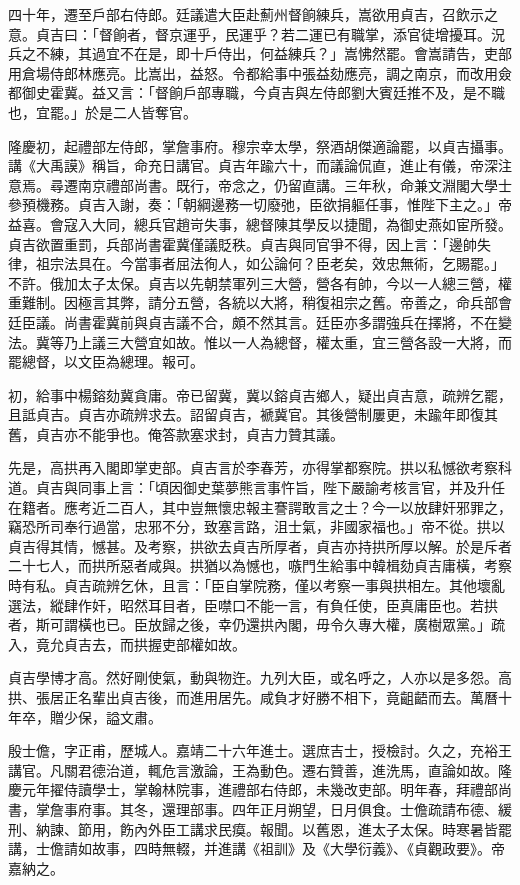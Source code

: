 \begin{pinyinscope}
四十年，遷至戶部右侍郎。廷議遣大臣赴薊州督餉練兵，嵩欲用貞吉，召飲示之意。貞吉曰：「督餉者，督京運乎，民運乎？若二運已有職掌，添官徒增擾耳。況兵之不練，其過宜不在是，即十戶侍出，何益練兵？」嵩怫然罷。會嵩請告，吏部用倉場侍郎林應亮。比嵩出，益怒。令都給事中張益劾應亮，調之南京，而改用僉都御史霍冀。益又言：「督餉戶部專職，今貞吉與左侍郎劉大賓廷推不及，是不職也，宜罷。」於是二人皆奪官。

隆慶初，起禮部左侍郎，掌詹事府。穆宗幸太學，祭酒胡傑適論罷，以貞吉攝事。講《大禹謨》稱旨，命充日講官。貞吉年踰六十，而議論侃直，進止有儀，帝深注意焉。尋遷南京禮部尚書。既行，帝念之，仍留直講。三年秋，命兼文淵閣大學士參預機務。貞吉入謝，奏：「朝綱邊務一切廢弛，臣欲捐軀任事，惟陛下主之。」帝益喜。會寇入大同，總兵官趙岢失事，總督陳其學反以捷聞，為御史燕如宦所發。貞吉欲置重罰，兵部尚書霍冀僅議貶秩。貞吉與同官爭不得，因上言：「邊帥失律，祖宗法具在。今當事者屈法徇人，如公論何？臣老矣，效忠無術，乞賜罷。」不許。俄加太子太保。貞吉以先朝禁軍列三大營，營各有帥，今以一人總三營，權重難制。因極言其弊，請分五營，各統以大將，稍復祖宗之舊。帝善之，命兵部會廷臣議。尚書霍冀前與貞吉議不合，頗不然其言。廷臣亦多謂強兵在擇將，不在變法。冀等乃上議三大營宜如故。惟以一人為總督，權太重，宜三營各設一大將，而罷總督，以文臣為總理。報可。

初，給事中楊鎔劾冀貪庸。帝已留冀，冀以鎔貞吉鄉人，疑出貞吉意，疏辨乞罷，且詆貞吉。貞吉亦疏辨求去。詔留貞吉，褫冀官。其後營制屢更，未踰年即復其舊，貞吉亦不能爭也。俺答款塞求封，貞吉力贊其議。

先是，高拱再入閣即掌吏部。貞吉言於李春芳，亦得掌都察院。拱以私憾欲考察科道。貞吉與同事上言：「頃因御史葉夢熊言事忤旨，陛下嚴諭考核言官，并及升任在籍者。應考近二百人，其中豈無懷忠報主謇諤敢言之士？今一以放肆奸邪罪之，竊恐所司奉行過當，忠邪不分，致塞言路，沮士氣，非國家福也。」帝不從。拱以貞吉得其情，憾甚。及考察，拱欲去貞吉所厚者，貞吉亦持拱所厚以解。於是斥者二十七人，而拱所惡者咸與。拱猶以為憾也，嗾門生給事中韓楫劾貞吉庸橫，考察時有私。貞吉疏辨乞休，且言：「臣自掌院務，僅以考察一事與拱相左。其他壞亂選法，縱肆作奸，昭然耳目者，臣噤口不能一言，有負任使，臣真庸臣也。若拱者，斯可謂橫也已。臣放歸之後，幸仍還拱內閣，毋令久專大權，廣樹眾黨。」疏入，竟允貞吉去，而拱握吏部權如故。

貞吉學博才高。然好剛使氣，動與物迕。九列大臣，或名呼之，人亦以是多怨。高拱、張居正名輩出貞吉後，而進用居先。咸負才好勝不相下，竟齟齬而去。萬曆十年卒，贈少保，謚文肅。

殷士儋，字正甫，歷城人。嘉靖二十六年進士。選庶吉士，授檢討。久之，充裕王講官。凡關君德治道，輒危言激論，王為動色。遷右贊善，進洗馬，直論如故。隆慶元年擢侍讀學士，掌翰林院事，進禮部右侍郎，未幾改吏部。明年春，拜禮部尚書，掌詹事府事。其冬，還理部事。四年正月朔望，日月俱食。士儋疏請布德、緩刑、納諫、節用，飭內外臣工講求民瘼。報聞。以舊恩，進太子太保。時寒暑皆罷講，士儋請如故事，四時無輟，并進講《祖訓》及《大學衍義》、《貞觀政要》。帝嘉納之。


\end{pinyinscope}
